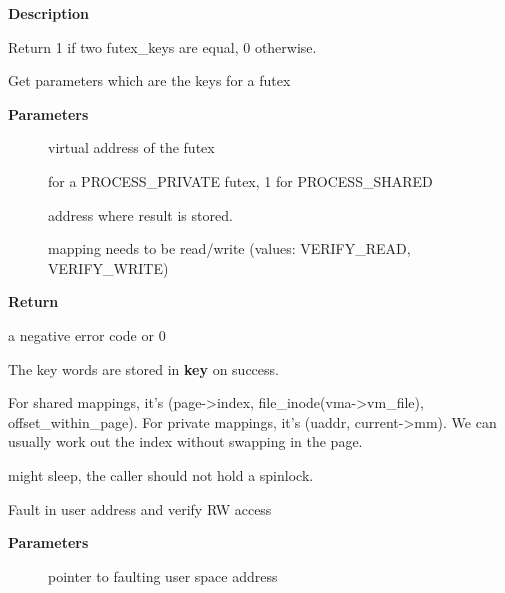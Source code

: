 \documentclass[a4paper,8pt,english]{sphinxmanual}
\begin{document}
\textbf{Description}

Return 1 if two futex\_keys are equal, 0 otherwise.

\begin{fulllineitems}
\label{kernel-hacking/locking:c.get_futex_key}
Get parameters which are the keys for a futex

\end{fulllineitems}


\textbf{Parameters}
\begin{description}
\item[{}] \leavevmode
virtual address of the futex

\item[{}]  for a PROCESS\_PRIVATE futex, 1 for PROCESS\_SHARED

\item[{}] \leavevmode
address where result is stored.

\item[{}] \leavevmode
mapping needs to be read/write (values: VERIFY\_READ,
VERIFY\_WRITE)

\end{description}

\textbf{Return}

a negative error code or 0

The key words are stored in \textbf{key} on success.

For shared mappings, it's (page-\textgreater{}index, file\_inode(vma-\textgreater{}vm\_file),
offset\_within\_page).  For private mappings, it's (uaddr, current-\textgreater{}mm).
We can usually work out the index without swapping in the page.

 might sleep, the caller should not hold a spinlock.

\begin{fulllineitems}
\label{kernel-hacking/locking:c.fault_in_user_writeable}
Fault in user address and verify RW access

\end{fulllineitems}


\textbf{Parameters}
\begin{description}
\item[{}] \leavevmode
pointer to faulting user space address

\end{description}
\end{document}
